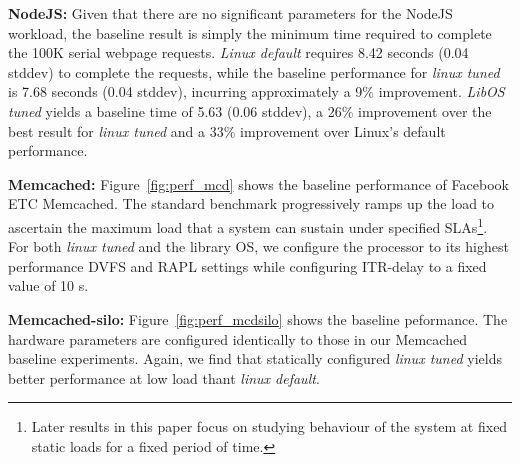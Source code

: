 \textbf{NodeJS:}
Given that there are no significant parameters for the NodeJS workload, the baseline result is simply the minimum time required to complete the 100K serial webpage requests. \textit{Linux default} requires 8.42 seconds (0.04 stddev) to complete the requests, while the baseline performance for \textit{linux tuned} is 7.68 seconds (0.04 stddev),  incurring approximately a 9\% improvement. \textit{LibOS tuned} yields a baseline time of 5.63 (0.06 stddev), a 26\% improvement over the best result for \textit{linux tuned} and a 33\% improvement over Linux's default performance.



\textbf{Memcached:}
Figure~\ref{fig:perf_mcd} shows the baseline performance of Facebook ETC Memcached. The standard benchmark progressively ramps up the load to ascertain the maximum load that a system can sustain under specified SLAs\footnote{ Later results in this paper focus on studying behaviour of the system at fixed static loads for a fixed period of time.
}. For both \textit{linux tuned} and the library OS, we configure the processor to its highest performance DVFS and RAPL settings while configuring ITR-delay to a fixed value of 10 {\micro}s.


\textbf{Memcached-silo:}
Figure~\ref{fig:perf_mcdsilo} shows the baseline peformance. The hardware parameters are configured identically to those in our Memcached baseline experiments. Again, we find that statically configured \textit{linux tuned} yields better performance at low load thant \textit{linux default}.








